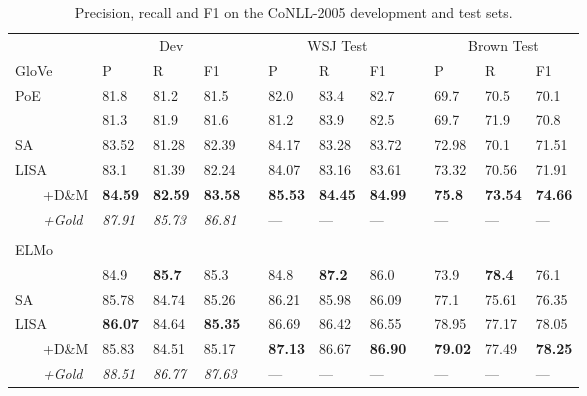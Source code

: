 \documentclass[11pt,a4paper]{article}
\begin{document}
\begin{table}[t!]
\begin{tabular}{llllllllllll}
& \multicolumn{3}{c}{Dev} && \multicolumn{3}{c}{WSJ Test} && \multicolumn{3}{c}{Brown Test} \\ \cline{2-4} \cline{6-8} \cline{10-12}
GloVe & P & R & F1 && P & R & F1 && P & R & F1\\ \hline \hline
\citet{he2017deep} PoE & 81.8 &  81.2 & 81.5 & & 82.0 & 83.4 & 82.7 && 69.7 &  70.5 & 70.1 \\ 
\citet{he2018jointly} & 81.3 & 81.9 & 81.6 & & 81.2 & 83.9 & 82.5 && 69.7 & 71.9 & 70.8\\ \hline
SA &  83.52 & 81.28 & 82.39 &&  84.17 &	83.28 &	83.72 && 72.98 & 70.1 & 71.51 \\ 
LISA &  83.1 & 81.39 &  82.24 && 84.07 & 83.16 & 83.61 && 73.32 & 70.56 & 71.91\\ 			
\ \ \ \ +D\&M & {\bf 84.59} & {\bf 82.59} &	{\bf 83.58} && {\bf 85.53} & {\bf 84.45} & {\bf 84.99} && {\bf 75.8} & {\bf 73.54} & {\bf 74.66}\\ 	
\ \ \ \ \emph{+Gold} & \emph{87.91} & \emph{85.73} & \emph{86.81} && --- & --- & --- && --- & --- & --- \\
& & & && & & && & & \\
ELMo & & & && & & && & & \\ \hline \hline
\citet{he2018jointly} & 84.9 & {\bf 85.7} & 85.3 & & 84.8 & {\bf 87.2} & 86.0 && 73.9 & {\bf 78.4} & 76.1\\ \hline
SA &  85.78	& 84.74	& 85.26 &&  86.21 &	85.98 &	86.09 && 77.1 &	75.61 &	76.35 \\ 
LISA &  {\bf 86.07} & 84.64 & {\bf 85.35} && 86.69 & 86.42 & 86.55 && 78.95 & 77.17 &	78.05\\ 			
\ \ \ \ +D\&M &85.83 &	84.51 &	85.17 && {\bf 87.13} & 86.67 & {\bf 86.90} && {\bf 79.02} & 77.49 & {\bf 78.25}\\ 	
\ \ \ \ \emph{+Gold} & \emph{88.51} & \emph{86.77} & \emph{87.63} && --- & --- & --- && --- & --- & ---
\end{tabular}
\caption{Precision, recall and F1 on the CoNLL-2005 development and test sets. \label{tab:conll05-results}}
\end{table}
\end{document}
